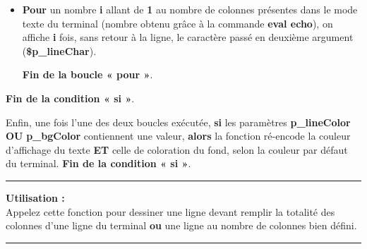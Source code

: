 \documentclass[a4paper,10pt]{article}
\begin{document}
\begin{itemize}
    \item
    {
        \begin{justify}
            \textbf{\color{loop}Pour} un nombre \textbf{\color{vars}i} allant de \textbf{\color{loop}1} au nombre de colonnes présentes dans le mode texte du terminal (nombre obtenu grâce à la commande \textbf{\color{cmds}eval echo}), on affiche \textbf{\color{vars}i} fois, sans retour à la ligne, le caractère passé en deuxième argument (\textbf{\color{vars}\$p\_lineChar}).
        \end{justify}\setlength{\parskip}{1em}

        \begin{justify}
            \textbf{\color{loop}Fin de la boucle « pour »}.
        \end{justify}
    }
\end{itemize}

\begin{justify}
    \textbf{\color{cond}Fin de la condition « si »}.
\end{justify}

\setlength{\parskip}{2em}


\begin{justify}
    Enfin, une fois l'une des deux boucles exécutée, \textbf{\color{cond}si} les paramètres \textbf{\color{vars}p\_lineColor} \textbf{\color{cond}OU} \textbf{\color{vars}p\_bgColor} contiennent une valeur, \textbf{\color{cond}alors} la fonction ré-encode la couleur d'affichage du texte \textbf{ET} celle de coloration du fond, selon la couleur par défaut du terminal. \textbf{\color{cond}Fin de la condition « si »}.
\end{justify}\setlength{\parskip}{1em}

\par\noindent\rule{\textwidth}{0.4pt}

\begin{justify}
    \textbf{Utilisation :}\\[1\baselineskip]
    Appelez cette fonction pour dessiner une ligne devant remplir la totalité des colonnes d'une ligne du terminal \textbf{ou} une ligne au nombre de colonnes bien défini.
\end{justify}



\color{sec3}\par\noindent\rule{\textwidth}{0.4pt}\color{text}
\end{document}
